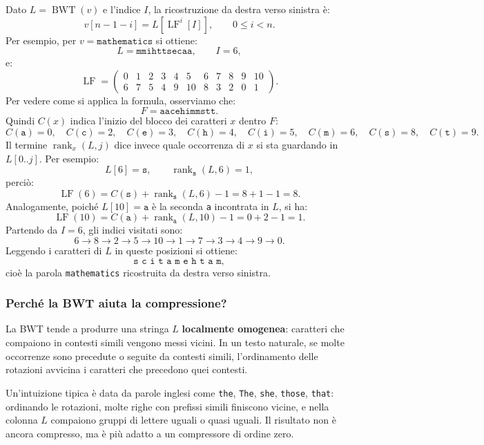 \documentclass{article}
\theoremstyle{definition}
\numberwithin{equation}{section}
\begin{document}
Dato $L=\operatorname{BWT}(v)$ e l'indice $I$, la ricostruzione da destra verso sinistra è:
\begin{equation}\label{eq:bwt_lf_reconstruction}
    v[n-1-i]=L[\operatorname{LF}^i[I]],
    \qquad
    0\leq i<n.
\end{equation}
Per esempio, per $v=\texttt{mathematics}$ si ottiene:
\[
    L=\texttt{mmihttsecaa},
    \qquad
    I=6,
\]
e:
\[
    \operatorname{LF}=
    \left(
    \begin{array}{ccccccccccc}
        0 & 1 & 2 & 3 & 4 & 5  & 6 & 7 & 8 & 9 & 10 \\
        6 & 7 & 5 & 4 & 9 & 10 & 8 & 3 & 2 & 0 & 1
    \end{array}
    \right).
\]
Per vedere come si applica la formula, osserviamo che:
\[
    F=\texttt{aacehimmstt}.
\]
Quindi $C(x)$ indica l'inizio del blocco dei caratteri $x$ dentro $F$:
\[
    C(\texttt{a})=0,\quad
    C(\texttt{c})=2,\quad
    C(\texttt{e})=3,\quad
    C(\texttt{h})=4,\quad
    C(\texttt{i})=5,\quad
    C(\texttt{m})=6,\quad
    C(\texttt{s})=8,\quad
    C(\texttt{t})=9.
\]
Il termine $\operatorname{rank}_x(L,j)$ dice invece quale occorrenza di $x$ si sta guardando in $L[0..j]$. Per esempio:
\[
    L[6]=\texttt{s},
    \qquad
    \operatorname{rank}_{\texttt{s}}(L,6)=1,
\]
perciò:
\[
    \operatorname{LF}(6)
    =
    C(\texttt{s})+\operatorname{rank}_{\texttt{s}}(L,6)-1
    =
    8+1-1
    =
    8.
\]
Analogamente, poiché $L[10]=\texttt{a}$ è la seconda \texttt{a} incontrata in $L$, si ha:
\[
    \operatorname{LF}(10)
    =
    C(\texttt{a})+\operatorname{rank}_{\texttt{a}}(L,10)-1
    =
    0+2-1
    =
    1.
\]
Partendo da $I=6$, gli indici visitati sono:
\[
    6\to 8\to 2\to 5\to 10\to 1\to 7\to 3\to 4\to 9\to 0.
\]
Leggendo i caratteri di $L$ in queste posizioni si ottiene:
\[
    \texttt{s c i t a m e h t a m},
\]
cioè la parola \texttt{mathematics} ricostruita da destra verso sinistra.

\subsubsection{Perché la BWT aiuta la compressione?}
La BWT tende a produrre una stringa $L$ \textbf{localmente omogenea}: caratteri che compaiono in contesti simili vengono messi vicini. In un testo naturale, se molte occorrenze sono precedute o seguite da contesti simili, l'ordinamento delle rotazioni avvicina i caratteri che precedono quei contesti.

Un'intuizione tipica è data da parole inglesi come \texttt{the}, \texttt{The}, \texttt{she}, \texttt{those}, \texttt{that}: ordinando le rotazioni, molte righe con prefissi simili finiscono vicine, e nella colonna $L$ compaiono gruppi di lettere uguali o quasi uguali. Il risultato non è ancora compresso, ma è più adatto a un compressore di ordine zero.
\end{document}
